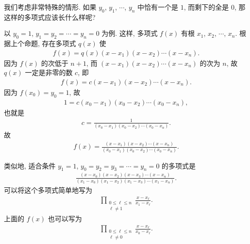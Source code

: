 \begin{example}
    我们考虑非常特殊的情形. 如果 $y_0$, $y_1$, $\cdots$, $y_n$ 中恰有一个是 $1$, 而剩下的全是 $0$, 那这样的多项式应该长什么样呢?

    以 $y_0 = 1$, $y_1 = y_2 = \cdots = y_n = 0$ 为例. 这样, 多项式 $f(x)$ 有根 $x_1$, $x_2$, $\cdots$, $x_n$. 根据上个命题, 存在多项式 $q(x)$ 使
    \begin{align*}
        f(x) = q(x) (x - x_1) (x - x_2) \cdots (x - x_n).
    \end{align*}
    因为 $f(x)$ 的次低于 $n+1$, 而 $(x - x_1) (x - x_2) \cdots (x - x_n)$ 的次为 $n$, 故 $q(x)$ 一定是非零的数 $c$, 即
    \begin{align*}
        f(x) = c (x - x_1) (x - x_2) \cdots (x - x_n).
    \end{align*}
    因为 $f(x_0) = y_0 = 1$, 故
    \begin{align*}
        1 = c (x_0 - x_1) (x_0 - x_2) \cdots (x_0 - x_n),
    \end{align*}
    也就是
    \begin{align*}
        c = \frac{1}{(x_0 - x_1) (x_0 - x_2) \cdots (x_0 - x_n)}.
    \end{align*}
    故
    \begin{align*}
        f(x) = \frac{(x - x_1) (x - x_2) \cdots (x - x_n)}{(x_0 - x_1) (x_0 - x_2) \cdots (x_0 - x_n)}.
    \end{align*}

    类似地, 适合条件 $y_1 = 1$, $y_0 = y_2 = y_3 = \cdots = y_n = 0$ 的多项式是
    \begin{align*}
        \frac{(x - x_0)(x - x_2)(x - x_3) \cdots (x - x_n)}{(x_1 - x_0)(x_1 - x_2)(x_1 - x_3) \cdots (x_1 - x_n)}.
    \end{align*}
    可以将这个多项式简单地写为
    \begin{align*}
        \prod_{\begin{smallmatrix}0 \leq \ell \leq n \\\ell \neq 1\end{smallmatrix}} \frac{x - x_\ell}{x_1 - x_\ell}.
    \end{align*}
    上面的 $f(x)$ 也可以写为
    \begin{align*}
        \prod_{\begin{smallmatrix}0 \leq \ell \leq n \\\ell \neq 0\end{smallmatrix}} \frac{x - x_\ell}{x_0 - x_\ell}.
    \end{align*}
\end{example}

